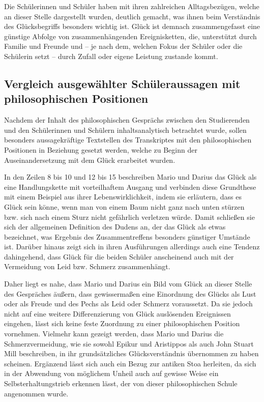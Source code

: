 Die Schülerinnen und Schüler haben mit ihren zahlreichen Alltagsbezügen, welche an dieser Stelle dargestellt wurden, deutlich gemacht, was ihnen beim Verständnis des Glücksbegriffs besonders wichtig ist. 
Glück ist demnach zusammengefasst eine günstige Abfolge von zusammenhängenden Ereignisketten, die, unterstützt durch Familie und Freunde und -- je nach dem, welchen Fokus der Schüler oder die Schülerin setzt -- durch Zufall oder eigene Leistung zustande kommt. 


\newpage



\subsection{Vergleich ausgewählter Schüleraussagen mit philosophischen Positionen}

Nachdem der Inhalt des philosophischen Gesprächs zwischen den Studierenden und den Schülerinnen und Schülern inhaltsanalytisch betrachtet wurde, sollen besonders aussagekräftige Textstellen des Transkriptes mit den philosophischen Positionen in Beziehung gesetzt werden, welche zu Beginn der Auseinandersetzung mit dem Glück erarbeitet wurden.

In den Zeilen 8 bis 10 und 12 bis 15 beschreiben Mario und Darius das Glück als eine Handlungskette mit vorteilhaftem Ausgang und verbinden diese Grundthese mit einem Beispiel aus ihrer Lebenswirklichkeit, indem sie erläutern, dass es Glück sein könne, wenn man von einem Baum nicht ganz nach unten stürzen bzw. sich nach einem Sturz nicht gefährlich verletzen würde. 
Damit schließen sie sich der allgemeinen Definition des Dudens an, der das Glück als etwas bezeichnet, \glqq was Ergebnis des Zusammentreffens besonders günstiger Umstände ist\grqq{}\cite{D16}.
Darüber hinaus zeigt sich in ihren Ausführungen allerdings auch eine Tendenz dahingehend, dass Glück für die beiden Schüler anscheinend auch mit der Vermeidung von Leid bzw. Schmerz zusammenhängt. 

Daher liegt es nahe, dass Mario und Darius ein Bild vom Glück an dieser Stelle des Gespräches äußern, dass gewissermaßen eine Einordnung des Glücks als Lust oder als Freude und des Pechs als Leid oder Schmerz voraussetzt. 
Da sie jedoch nicht auf eine weitere Differenzierung von Glück auslösenden Ereignissen eingehen, lässt sich keine feste Zuordnung zu einer philosophischen Position vornehmen. 
Vielmehr kann gezeigt werden, dass Mario und Darius die Schmerzvermeidung, wie sie sowohl Epikur und Aristippos als auch John Stuart Mill beschreiben, in ihr grundsätzliches Glücksverständnis übernommen zu haben scheinen. 
Ergänzend lässt sich auch ein Bezug zur antiken Stoa herleiten, da sich in der Abwendung von möglichem Unheil auch auf gewisse Weise ein Selbsterhaltungstrieb erkennen lässt, der von dieser philosophischen Schule angenommen wurde. 


